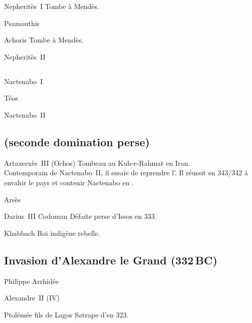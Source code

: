 \begin{listerois}
  \item [Nepheritès~I\ier \datation{(398-392)}] Tombe à Mendès.
  \item [Psamouthis]
  \item [Achoris \datation{(391-379)}] Tombe à Mendès.
  \item [Nepheritès~II]
\end{listerois}

\subsection{\texorpdfstring{}{XXXe dynastie}}


\begin{listerois}
  \item [Nactenabo~I\ier \datation{(378-360)}]
  \item [Téos \datation{(361-359)}]
  \item [Nactenabo~II \datation{(359-341)}]
\end{listerois}

\subsection{\texorpdfstring{}{XXXIe dynastie} (seconde 
domination perse)}

\begin{listerois}
  \item [Artaxerxès~III (Ochos) \datation{(358-338)}] 
        Tombeau au Kuh-e-Rahmat en Iran. \\ 
        Contemporain de Nactenabo~II, il essaie de reprendre l'\kmt.
        Il réussit en 343/342 à envahir le pays et contenir Nactenabo 
        en \HE.
  \item [Arsès] 
  \item [Darius~III Codoman \datation{(335-330)}] 
        Défaite perse d'Issos en 333.
  \item [Khabbach] Roi indigène rebelle.
\end{listerois}

\subsection{Invasion d'Alexandre le Grand (332\,BC)}

\begin{listerois}
  \item [Philippe Arrhidée]
  \item [Alexandre~II (IV)]
  \item [Ptolémée fils de Lagos] Satrape d'\kmt en 323.
\end{listerois}

